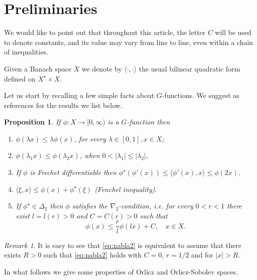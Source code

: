 \documentclass[twoside]{article}
\theoremstyle{definition}
\theoremstyle{plain}
\newtheorem{Propos}[definition]{Proposition}
\theoremstyle{remark}
\newtheorem{remark}{Remark}[section]
\begin{document}
\section{Preliminaries}\label{Preliminares}

We would like to point out that throughout this article, the letter $C$ will be used to denote constants, and its value may vary from line to line, even within a chain of inequalities.

Given a Banach space $X$ we denote by $\langle \cdot,\cdot\rangle$ the usual bilinear quadratic form defined on $ X^\star\times X$.


Let us start by recalling a few simple facts about $G$-functions.  We suggest \cite{Mazzone2019,2002applications,donaldson1971orlicz,trudinger1974imbedding} as references for the results we list below.

\begin{Propos}\label{propos:Gfuncion_elementales} If $\phi:X\to [0,\infty)$ is a $G$-function then

\begin{enumerate}
 \item     $\phi(\lambda x)\leq \lambda\phi(x)$, for every  $\lambda\in[0,1],x\in X$;
 \item $\phi(\lambda_1 x)\leq\phi(\lambda_2 x)$, when  $0<|\lambda_1|\leq |\lambda_2| $,
 \item If $\phi$ is Frechet differentiable then $\phi^{\star}\left(\phi'(x) \right)\leq \langle \phi'(x),x\rangle\leq \phi(2x)$.
  \item $\langle \xi , x\rangle \leq  \phi(x)+\phi^{\star}(\xi)$ (Fenchel inequality).
\item If $\phi^{\star}\in\Delta_2$ then $\phi$ satisfies the \emph{$\nabla_2$-condition}, i.e.  for every $0<r<1$ there exist $l=l(r)>0$ and $C=C(r)>0$ such that
\begin{equation}\label{eq:nabla2}
  \phi(x)\leq \frac{r}{l}\phi(l x)+C,\quad x\in X.
\end{equation}



\end{enumerate}

\end{Propos}


\begin{remark}
 It is easy to see that \eqref{eq:nabla2}  is equivalent  to  assume that there exists $R>0$ such that   \eqref{eq:nabla2} holds  with $C=0$,  $r=1/2$ and for $|x|>R$.
\end{remark}
In what follows we give some properties of   Orlicz and Orlicz-Sobolev spaces.
\end{document}

